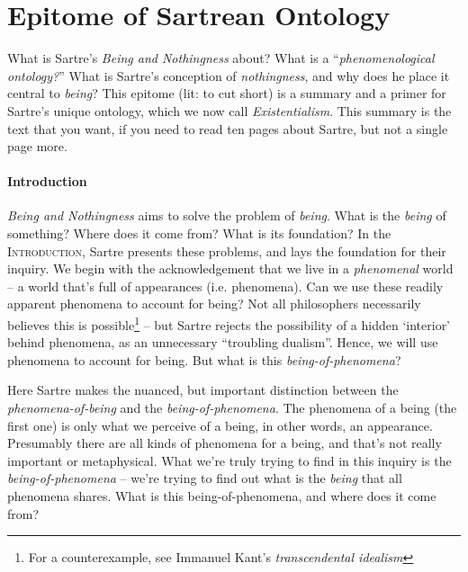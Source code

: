 \chapter{Epitome of Sartrean Ontology}


What is Sartre's \emph{Being and Nothingness} about? What is a \enquote{\emph{phenomenological ontology?}} What is Sartre's conception of \emph{nothingness}, and why does he place it central to \emph{being}? This epitome (lit: to cut short) is a summary and a primer for Sartre's unique ontology, which we now call \emph{Existentialism}. This summary is the text that you want, if you need to read ten pages about Sartre, but not a single page more. 

\subsubsection{Introduction}

\emph{Being and Nothingness} aims to solve the problem of \emph{being}. What is the \emph{being} of something? Where does it come from? What is its foundation? In the \textsc{Introduction}, Sartre presents these problems, and lays the foundation for their inquiry. We begin with the acknowledgement that we live in a \emph{phenomenal} world -- a world that's full of appearances (i.e. phenomena). Can we use these readily apparent phenomena to account for being? Not all philosophers necessarily believes this is possible\footnote{For a counterexample, see Immanuel Kant's \emph{transcendental idealism}} -- but Sartre rejects the possibility of a hidden \enquote*{interior} behind phenomena, as an unnecessary \enquote{troubling dualism}. Hence, we will use phenomena to account for being. But what is this \emph{being-of-phenomena}?

Here Sartre makes the nuanced, but important distinction between the \emph{phenomena-of-being} and the \emph{being-of-phenomena}. The phenomena of a being (the first one) is only what we perceive of a being, in other words, an appearance. Presumably there are all kinds of phenomena for a being, and that's not really important or metaphysical. What we're truly trying to find in this inquiry is the \emph{being-of-phenomena} -- we're trying to find out what is the \emph{being} that all phenomena shares. What is this being-of-phenomena, and where does it come from? 

